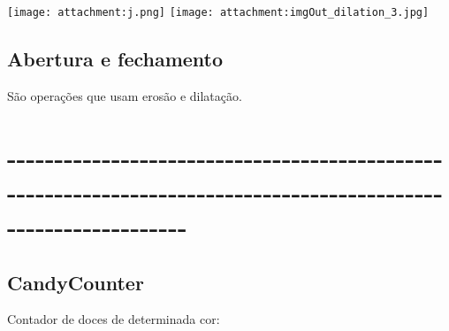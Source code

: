 \documentclass[11pt]{article}
\makeatletter
\def\maxwidth{\ifdim\Gin@nat@width>\linewidth\linewidth
    \else\Gin@nat@width\fi}
\let\Oldincludegraphics\includegraphics
\renewcommand{\includegraphics}[1]{\Oldincludegraphics[width=.8\maxwidth]{#1}}
\makeatother
\begin{document}
    \texttt{[image: attachment:j.png]}
\texttt{[image: attachment:imgOut\_dilation\_3.jpg]}

    \subsection{Abertura e fechamento}\label{abertura-e-fechamento}

São operações que usam erosão e dilatação.

    \section{-\/-\/-\/-\/-\/-\/-\/-\/-\/-\/-\/-\/-\/-\/-\/-\/-\/-\/-\/-\/-\/-\/-\/-\/-\/-\/-\/-\/-\/-\/-\/-\/-\/-\/-\/-\/-\/-\/-\/-\/-\/-\/-\/-\/-\/-\/-\/-\/-\/-\/-\/-\/-\/-\/-\/-\/-\/-\/-\/-\/-\/-\/-\/-\/-\/-\/-\/-\/-\/-\/-\/-\/-\/-\/-\/-\/-\/-\/-\/-\/-\/-\/-\/-\/-\/-\/-\/-\/-\/-\/-\/-\/-\/-\/-\/-\/-\/-\/-\/-\/-\/-\/-\/-\/-\/-\/-\/-\/-\/-\/-}\label{section}

\subsection{CandyCounter}\label{candycounter}

Contador de doces de determinada cor:
\end{document}
